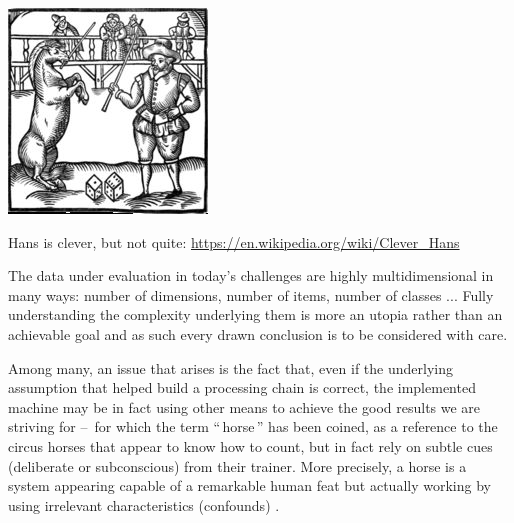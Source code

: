 \documentclass[a4paper,fleqn]{tufte-handout}
\begin{document}
\begin{marginfigure}
\begin{center}
\includegraphics[width=\textwidth]{figures/hans} 
\end{center}
\caption{\label{fig:hans} Hans is clever, but not quite: \url{https://en.wikipedia.org/wiki/Clever_Hans}}
\end{marginfigure}

The data under evaluation in today's challenges are highly multidimensional in many ways: number of dimensions, number of items, number of classes ... Fully understanding the complexity underlying them is more an utopia rather than an achievable goal and as such every drawn conclusion is to be considered with care.

Among many, an issue that arises is the fact that, even if the underlying assumption that helped build a processing chain is correct, the implemented machine may be in fact using other means to achieve the good results we are striving for --~for which the term ``\,horse\,'' has been coined, as a reference to the circus horses that appear to know how to count, but in fact rely on subtle cues (deliberate or subconscious) from their trainer. More precisely, a horse is a system appearing capable of a remarkable human feat but actually working by using irrelevant characteristics (confounds) \cite{6847693}.
\end{document}
